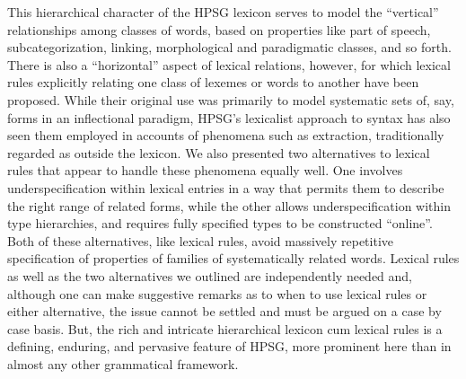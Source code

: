\documentclass[output=paper]{langsci/langscibook}
\begin{document}
This hierarchical character of the HPSG lexicon serves to model the ``vertical'' relationships among classes of words, based on properties like part of speech, subcategorization, linking, morphological and paradigmatic classes, and so forth.
There is also a ``horizontal'' aspect of lexical relations, however, for which lexical rules explicitly relating one class of lexemes or words to another have been proposed.
While their original use was primarily to model systematic sets of, say, forms in an inflectional paradigm, HPSG's lexicalist approach to syntax has also seen them employed in accounts of phenomena such as extraction, traditionally regarded as outside the lexicon.
We also presented two alternatives to lexical rules that appear to handle these phenomena equally well.
One involves underspecification within lexical entries in a way that permits them to describe the right range of related forms, while the other allows underspecification within type hierarchies, and requires fully specified types to be constructed ``online''.
Both of these alternatives, like lexical rules, avoid massively repetitive specification of properties of families of systematically related words. Lexical rules as well as the two alternatives we outlined are independently needed and, although one can make suggestive remarks as to when to use lexical rules or either alternative, the issue cannot be settled  and must be argued on a case by case basis. But, the rich and intricate hierarchical lexicon cum lexical rules is a defining, enduring, and pervasive feature of HPSG, more prominent here than in almost any other grammatical framework.





 

\printbibliography[heading=subbibliography,notkeyword=this] 
\end{document}
